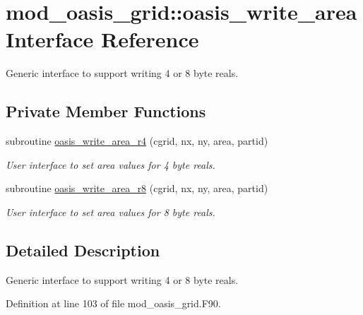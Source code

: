\hypertarget{interfacemod__oasis__grid_1_1oasis__write__area}{\section{mod\+\_\+oasis\+\_\+grid\+:\+:oasis\+\_\+write\+\_\+area Interface Reference}
\label{interfacemod__oasis__grid_1_1oasis__write__area}
}


Generic interface to support writing 4 or 8 byte reals.  


\subsection*{Private Member Functions}
\begin{DoxyCompactItemize}
\item 
subroutine \hyperlink{interfacemod__oasis__grid_1_1oasis__write__area_af355601b9ced09ab6bf152fada2d6d79}{oasis\+\_\+write\+\_\+area\+\_\+r4} (cgrid, nx, ny, area, partid)
\begin{DoxyCompactList}\small\item\em User interface to set area values for 4 byte reals. \end{DoxyCompactList}\item 
subroutine \hyperlink{interfacemod__oasis__grid_1_1oasis__write__area_a52b5ad6f028f6710ae4c17da1062dab4}{oasis\+\_\+write\+\_\+area\+\_\+r8} (cgrid, nx, ny, area, partid)
\begin{DoxyCompactList}\small\item\em User interface to set area values for 8 byte reals. \end{DoxyCompactList}\end{DoxyCompactItemize}


\subsection{Detailed Description}
Generic interface to support writing 4 or 8 byte reals. 

Definition at line 103 of file mod\+\_\+oasis\+\_\+grid.\+F90.



